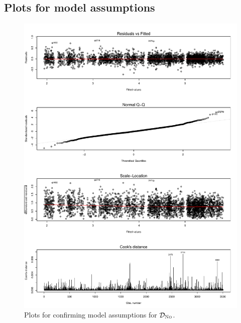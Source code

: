 
\subsection{Plots for model assumptions}
\label{appx:model_assumptions}

\begin{figure}[!ht]
    \center
    \includegraphics[width=\textwidth]{../plots/model_np_assumptions}    
    \caption{Plots for confirming model assumptions for $\mathcal{D}_{\textsc{No}}$.}    
    \label{fig:model_np_assumptions}
\end{figure}


